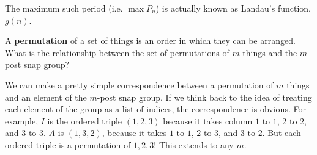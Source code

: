\documentclass[../key.tex]{subfiles}
\begin{document}
\noindent The maximum such period (i.e. $\max P_n$) is actually known as Landau's function, $g(n)$.

\begin{outer_problem}
\item A \textbf{permutation} of a set of things is an order in which they can be arranged. What is the relationship between the set of permutations of $m$ things and the $m$-post snap group?
\end{outer_problem}

\noindent We can make a pretty simple correspondence between a permutation of $m$ things and an element of the $m$-post snap group. If we think back to the idea of treating each element of the group as a list of indices, the correspondence is obvious. For example, $I$ is the ordered triple $(1,2,3)$ because it takes column $1$ to $1$, $2$ to $2$, and $3$ to $3$. $A$ is $(1,3,2)$, because it takes $1$ to $1$, $2$ to $3$, and $3$ to $2$. But each ordered triple is a permutation of ${1,2,3}$! This extends to any $m$.
\end{document}
